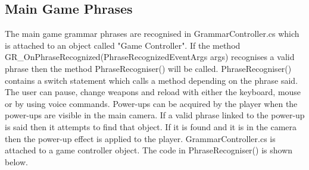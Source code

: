 \documentclass{article}
\begin{document}
\subsection{Main Game Phrases}
The main game grammar phrases are recognised in GrammarController.cs which is attached to an object called "Game Controller". If the method GR\_OnPhraseRecognized(PhraseRecognizedEventArgs args) recognises a valid phrase then the method PhraseRecogniser() will be called. PhraseRecogniser() contains a switch statement which calls a method depending on the phrase said. The user can pause, change weapons and reload with either the keyboard, mouse or by using voice commands. Power-ups can be acquired by the player when the power-ups are visible in the main camera. If a valid phrase linked to the power-up is said then it attempts to find that object. If it is found and it is in the camera then the power-up effect is applied to the player. GrammarController.cs is attached to a game controller object. The code in PhraseRecogniser() is shown below.
\end{document}
